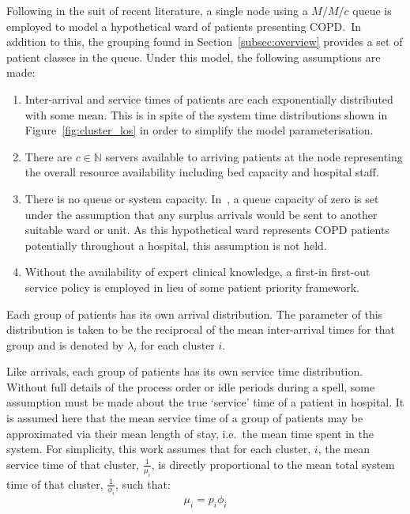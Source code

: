 \documentclass[11pt]{article}
\begin{document}
Following in the suit of recent literature, a single node using a \(M/M/c\)
queue is employed to model a hypothetical ward of patients presenting COPD.\ In
addition to this, the grouping found in Section~\ref{subsec:overview} provides
a set of patient classes in the queue. Under this model, the following
assumptions are made:
\begin{enumerate}
    \item Inter-arrival and service times of patients are each exponentially
        distributed with some mean. This is in spite of the system time
        distributions shown in Figure~\ref{fig:cluster_los} in order to
        simplify the model parameterisation.
    \item There are \(c \in \mathbb{N}\) servers available to arriving patients
        at the node representing the overall resource availability including bed
        capacity and hospital staff.
    \item There is no queue or system capacity. In~\cite{Williams2015}, a
        queue capacity of zero is set under the assumption that any surplus
        arrivals would be sent to another suitable ward or unit. As this
        hypothetical ward represents COPD patients potentially throughout a
        hospital, this assumption is not held.
    \item Without the availability of expert clinical knowledge, a first-in
        first-out service policy is employed in lieu of some patient priority 
        framework.
\end{enumerate}

Each group of patients has its own arrival distribution. The parameter of this
distribution is taken to be the reciprocal of the mean inter-arrival times for
that group and is denoted by \(\lambda_i\) for each cluster \(i\).

Like arrivals, each group of patients has its own service time distribution.
Without full details of the process order or idle periods during a spell, some
assumption must be made about the true `service' time of a patient in hospital.
It is assumed here that the mean service time of a group of patients may be
approximated via their mean length of stay, i.e.\ the mean time spent in the
system. For simplicity, this work assumes that for each cluster, \(i\), the mean
service time of that cluster, \(\frac{1}{\mu_i}\), is directly proportional to
the mean total system time of that cluster, \(\frac{1}{\phi_i}\), such that:
\begin{equation}\label{eq:services}
    \mu_i = p_i \phi_i
\end{equation}
\end{document}
